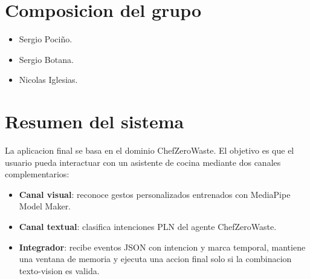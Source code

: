 \documentclass[12pt,a4paper]{article}
\begin{document}
\section{Composicion del grupo}

\begin{itemize}
    \item Sergio Pociño.
    \item Sergio Botana.
    \item Nicolas Iglesias.
\end{itemize}

\section{Resumen del sistema}

La aplicacion final se basa en el dominio ChefZeroWaste. El objetivo es que el usuario pueda interactuar con un asistente de cocina mediante dos canales complementarios:

\begin{itemize}
    \item \textbf{Canal visual}: reconoce gestos personalizados entrenados con MediaPipe Model Maker.
    \item \textbf{Canal textual}: clasifica intenciones PLN del agente ChefZeroWaste.
    \item \textbf{Integrador}: recibe eventos JSON con intencion y marca temporal, mantiene una ventana de memoria y ejecuta una accion final solo si la combinacion texto-vision es valida.
\end{itemize}
\end{document}
